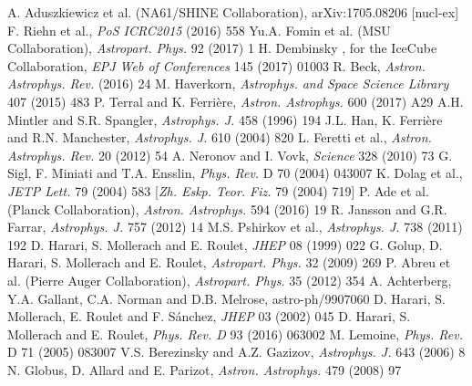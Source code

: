 \documentclass[twoside,12pt]{article}
\begin{document}
\begin{thebibliography}{99}
  A. Aduszkiewicz et al. (NA61/SHINE Collaboration),  arXiv:1705.08206 [nucl-ex]  %
 F. Riehn et al., {\it PoS ICRC2015} (2016) 558
 Yu.A. Fomin et al. (MSU Collaboration), {\it Astropart. Phys.} 92 (2017) 1
 H. Dembinsky , for the IceCube Collaboration, {\it EPJ Web of Conferences} 145 (2017) 01003
 R. Beck, {\it Astron. Astrophys. Rev.} (2016) 24 %
 M. Haverkorn, {\it Astrophys. and Space Science Library} 407 (2015) 483 %
 P. Terral and  K. Ferri\`ere, {\it Astron. Astrophys.} 600 (2017) A29
 A.H. Mintler and  S.R. Spangler, {\it Astrophys. J.} 458 (1996) 194 %
 J.L. Han, K. Ferri\`ere and R.N. Manchester, {\it Astrophys. J.} 610 (2004) 820
L. Feretti et al., {\it Astron. Astrophys. Rev.} 20 (2012) 54
 A. Neronov and I. Vovk, {\it Science} 328 (2010) 73 %
 G. Sigl, F. Miniati and T.A. Ensslin, {\it Phys. Rev.} D 70 (2004) 043007 %
 K. Dolag et al., {\it JETP Lett.} 79 (2004) 583 [{\it Zh. Eskp. Teor. Fiz.} 79 (2004) 719] %
 P. Ade et al. (Planck Collaboration), {\it Astron. Astrophys.} 594 (2016) 19 %
 R. Jansson and G.R. Farrar, {\it Astrophys. J.} 757 (2012) 14
 M.S. Pshirkov et al., {\it Astrophys. J.} 738 (2011) 192
 D. Harari, S. Mollerach and E. Roulet, {\it JHEP} 08 (1999) 022 %
 G. Golup, D. Harari, S. Mollerach and E. Roulet, {\it Astropart. Phys.} 32 (2009) 269 %
 P. Abreu et al. (Pierre Auger Collaboration), {\it Astropart. Phys.} 35 (2012) 354
 A. Achterberg, Y.A. Gallant, C.A. Norman and D.B. Melrose, astro-ph/9907060
D. Harari, S. Mollerach, E. Roulet and F. S\'anchez, {\it JHEP} 03 (2002) 045 %
 D. Harari, S. Mollerach and E. Roulet, {\it Phys. Rev. D} 93 (2016) 063002 %
 M. Lemoine, {\it Phys. Rev.} D 71 (2005) 083007
 V.S. Berezinsky and A.Z. Gazizov, {\it Astrophys. J.} 643 (2006) 8 
 N. Globus, D. Allard and  E. Parizot, {\it Astron. Astrophys.} 479 (2008) 97

\end{thebibliography}
\end{document}
